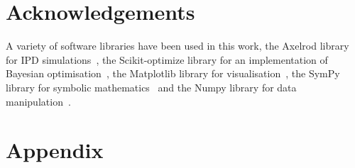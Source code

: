 \documentclass[10pt]{article}
\begin{document}
\section{Acknowledgements}

A variety of software libraries have been used in this work,
the Axelrod library for IPD simulations~\cite{axelrodproject},
the Scikit-optimize library for an implementation of Bayesian optimisation~\cite{tim_head_2018_1207017},
the Matplotlib library for visualisation~\cite{hunter2007matplotlib},
the SymPy library for symbolic mathematics~\cite{sympy} and
the Numpy library for data manipulation~\cite{walt2011numpy}.




\section{Appendix}
\end{document}

